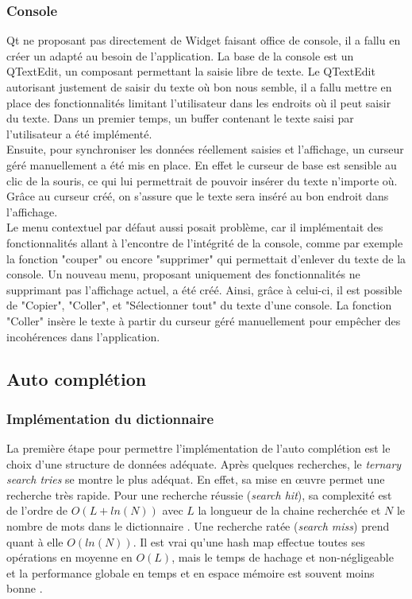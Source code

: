 \documentclass[french]{article}
\begin{document}
	\subsubsection{Console}
	Qt ne proposant pas directement de Widget faisant office de console, il a fallu en créer un adapté au besoin de l'application. La base de la console est un QTextEdit, un composant permettant la saisie libre de texte. Le QTextEdit autorisant justement de saisir du texte où bon nous semble, il a fallu mettre en place des fonctionnalités limitant l'utilisateur dans les endroits où il peut saisir du texte. Dans un premier temps, un buffer contenant le texte saisi par l'utilisateur a été implémenté.\\
	Ensuite, pour synchroniser les données réellement saisies et l'affichage, un curseur géré manuellement a été mis en place. En effet le curseur de base est sensible au clic de la souris, ce qui lui permettrait de pouvoir insérer du texte n'importe où. Grâce au curseur créé, on s'assure que le texte sera inséré au bon endroit dans l'affichage.\\
	Le menu contextuel par défaut aussi posait problème, car il implémentait des fonctionnalités allant à l'encontre de l'intégrité de la console, comme par exemple la fonction "couper" ou encore "supprimer" qui permettait d'enlever du texte de la console. Un nouveau menu, proposant uniquement des fonctionnalités ne supprimant pas l'affichage actuel, a été créé. Ainsi, grâce à celui-ci, il est possible de "Copier", "Coller", et "Sélectionner tout" du texte d'une console. La fonction "Coller" insère le texte à partir du curseur géré manuellement pour empêcher des incohérences dans l'application.
	\subsection{Auto complétion}
	\subsubsection{Implémentation du dictionnaire}
	La première étape pour permettre l'implémentation de l'auto complétion est le choix d'une structure de données adéquate. Après quelques recherches, le \textit{ternary search tries} se montre le plus adéquat. En effet, sa mise en œuvre permet une recherche très rapide. Pour une recherche réussie (\textit{search hit}), sa complexité est de l'ordre de $O(L + ln(N))$ avec $L$ la longueur de la chaine recherchée et $N$ le nombre de mots dans le dictionnaire \cite{tries}. Une recherche ratée (\textit{search miss}) prend quant à elle $O(ln(N))$. Il est vrai qu'une hash map effectue toutes ses opérations en moyenne en $O(L)$, mais le temps de hachage et non-négligeable et la performance globale en temps et en espace mémoire est souvent moins bonne \cite{sedgewick}.
	
\end{document}
